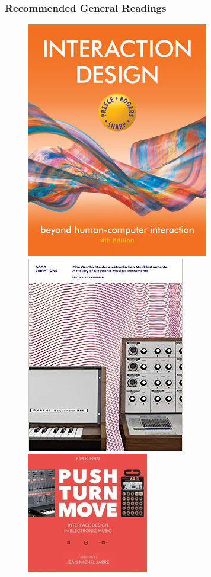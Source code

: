 \documentclass[screen, aspectratio=169]{beamer}
\begin{document}
\begin{frame}
\frametitle{Recommended General Readings}
\begin{figure}
\includegraphics[scale=1]{img/id-book.jpg}
\includegraphics[scale=0.29]{img/good-vibrations-book.jpg}
\includegraphics[scale=0.46]{img/push-turn-move-book.jpg}

\end{figure}
\end{frame}
\end{document}
